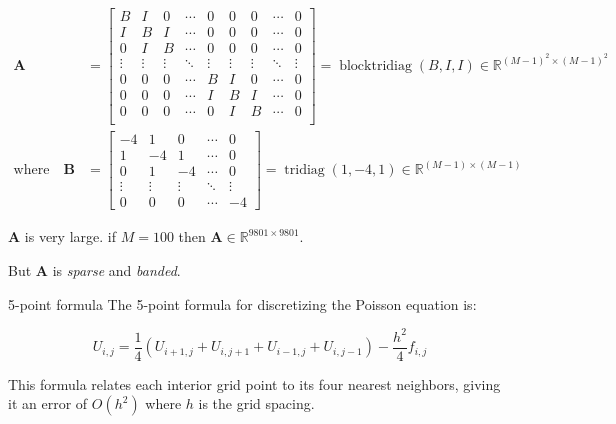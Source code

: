 \begin{align*}
  \symbf{A} & =
  \begin{bmatrix}
    B      & I      & 0      & \cdots & 0      & 0      & 0      & \cdots & 0      \\
    I      & B      & I      & \cdots & 0      & 0      & 0      & \cdots & 0      \\
    0      & I      & B      & \cdots & 0      & 0      & 0      & \cdots & 0      \\
    \vdots & \vdots & \vdots & \ddots & \vdots & \vdots & \vdots & \ddots & \vdots \\
    0      & 0      & 0      & \cdots & B      & I      & 0      & \cdots & 0      \\
    0      & 0      & 0      & \cdots & I      & B      & I      & \cdots & 0      \\
    0      & 0      & 0      & \cdots & 0      & I      & B      & \cdots & 0      \\
  \end{bmatrix}
  = \operatorname{blocktridiag}(B,I,I) \in \mathbb{R}^{(M-1)^2 \times (M-1)^2} \\
  \text{where} \quad
  \symbf{B} & = \begin{bmatrix}
                  -4     & 1      & 0      & \cdots & 0      \\
                  1      & -4     & 1      & \cdots & 0      \\
                  0      & 1      & -4     & \cdots & 0      \\
                  \vdots & \vdots & \vdots & \ddots & \vdots \\
                  0      & 0      & 0      & \cdots & -4
                \end{bmatrix}
  = \operatorname{tridiag}(1,-4,1) \in \mathbb{R}^{(M-1)\times(M-1)}
\end{align*}

\(\symbf{A}\) is very large. if \(M=100\) then \(\symbf{A} \in \mathbb{R}^{9801 \times 9801}\).

But \(\symbf{A}\) is \emph{sparse} and \emph{banded}.

\begin{definition}{5-point formula}{}
  The 5-point formula for discretizing the Poisson equation is:

  \begin{equation*}
    U_{i,j} = \frac{1}{4}\left(U_{i+1,j} + U_{i,j+1} + U_{i-1,j} + U_{i,j-1}\right) - \frac{h^2}{4}f_{i,j}
  \end{equation*}

  This formula relates each interior grid point to its four nearest neighbors, giving it an error of $O(h^2)$ where $h$ is the grid spacing.
\end{definition}
